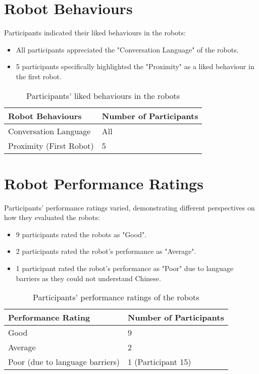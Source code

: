 \section{Robot Behaviours}

Participants indicated their liked behaviours in the robots:
\begin{itemize}
\item All participants appreciated the "Conversation Language" of the robots.
\item 5 participants specifically highlighted the "Proximity" as a liked behaviour in the first robot.
\end{itemize}

\begin{table}[h]
\centering
\begin{tabular}{|l|l|}
\hline
\textbf{Robot Behaviours} & \textbf{Number of Participants} \\
\hline
Conversation Language & All \\
\hline
Proximity (First Robot) & 5 \\
\hline
\end{tabular}
\caption{Participants' liked behaviours in the robots}
\label{tab:robot_behaviours}
\end{table}

\section{Robot Performance Ratings}

Participants' performance ratings varied, demonstrating different perspectives on how they evaluated the robots:
\begin{itemize}
\item 9 participants rated the robots as "Good".
\item 2 participants rated the robot's performance as "Average".
\item 1 participant rated the robot's performance as "Poor" due to language barriers as they could not understand Chinese.
\end{itemize}

\begin{table}[h]
\centering
\begin{tabular}{|l|l|}
\hline
\textbf{Performance Rating} & \textbf{Number of Participants} \\
\hline
Good & 9 \\
\hline
Average & 2 \\
\hline
Poor (due to language barriers) & 1 (Participant 15) \\
\hline
\end{tabular}
\vspace{1em}
\caption{Participants' performance ratings of the robots}
\label{tab:performance_ratings}
\end{table}

